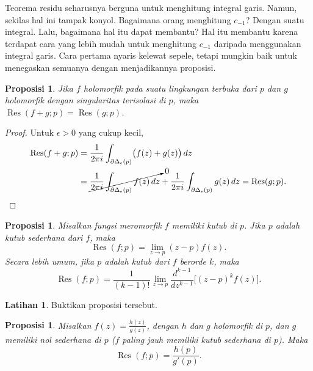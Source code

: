\documentclass[12pt,openany]{book}
\theoremstyle{plain}
\newtheorem{prop}[thm]{Proposisi}
\theoremstyle{remark}
\theoremstyle{definition}
\newenvironment{exbox}{%
    \def\FrameCommand{\vrule width 1pt \relax\hspace{10pt}}%
    \MakeFramed{\advance\hsize-\width\FrameRestore}%
}{%
    \endMakeFramed
}
\theoremstyle{exercise}
\newtheorem{exercise}{Latihan}[section]
\theoremstyle{example}
\begin{document}
Teorema residu seharusnya berguna untuk menghitung integral garis.
Namun, sekilas hal ini tampak konyol. Bagaimana orang menghitung $c_{-1}$? Dengan
suatu integral. Lalu, bagaimana hal itu dapat membantu? Hal itu membantu karena terdapat
cara yang lebih mudah untuk menghitung $c_{-1}$ daripada menggunakan integral garis. Cara pertama
nyaris kelewat sepele, tetapi mungkin baik untuk menegaskan semuanya
dengan menjadikannya proposisi.

\begin{prop}
Jika $f$ holomorfik pada suatu lingkungan terbuka dari $p$ dan $g$ holomorfik
dengan singularitas terisolasi di $p$, maka
$\operatorname{Res}(f+g;p) = \operatorname{Res}(g;p)$.
\end{prop}

\begin{proof}
Untuk $\epsilon > 0$ yang cukup kecil,
\begin{equation*}
\begin{split}
\operatorname{Res}(f+g;p)
& =
\frac{1}{2\pi i}
\int_{\partial \Delta_{\epsilon}(p)}
\bigl(f(z)+g(z)\bigr) \, dz
\\
& =
\cancelto{0}{
\frac{1}{2\pi i}
\int_{\partial \Delta_{\epsilon}(p)}
f(z) \, dz
}
+
\frac{1}{2\pi i}
\int_{\partial \Delta_{\epsilon}(p)}
g(z) \, dz
=
\operatorname{Res}(g;p) . \qedhere
\end{split}
\end{equation*}
\end{proof}

\begin{prop}
Misalkan fungsi meromorfik $f$ memiliki kutub di $p$.
Jika $p$ adalah kutub sederhana dari $f$, maka
\begin{equation*}
\operatorname{Res}(f;p) = \lim_{z\to p} (z-p) f(z) .
\end{equation*}
Secara lebih umum, jika $p$ adalah kutub dari $f$ berorde $k$, maka
\begin{equation*}
\operatorname{Res}(f;p) = \frac{1}{(k-1)!} \lim_{z\to p}
\frac{d^{k-1}}{dz^{k-1}}\bigl[ (z-p)^{k} f(z) \bigr] .
\end{equation*}
\end{prop}

\begin{exbox}
\begin{exercise}
Buktikan proposisi tersebut.
\end{exercise}
\end{exbox}

\begin{prop} \label{prop:residuesimpleratio}
Misalkan $f(z) = \frac{h(z)}{g(z)}$, dengan $h$ dan $g$ holomorfik
di $p$, dan $g$ memiliki nol sederhana di $p$
($f$ paling jauh memiliki kutub sederhana di $p$).
Maka
\begin{equation*}
\operatorname{Res}(f;p) = \frac{h(p)}{g'(p)} .
\end{equation*}
\end{prop}
\end{document}
